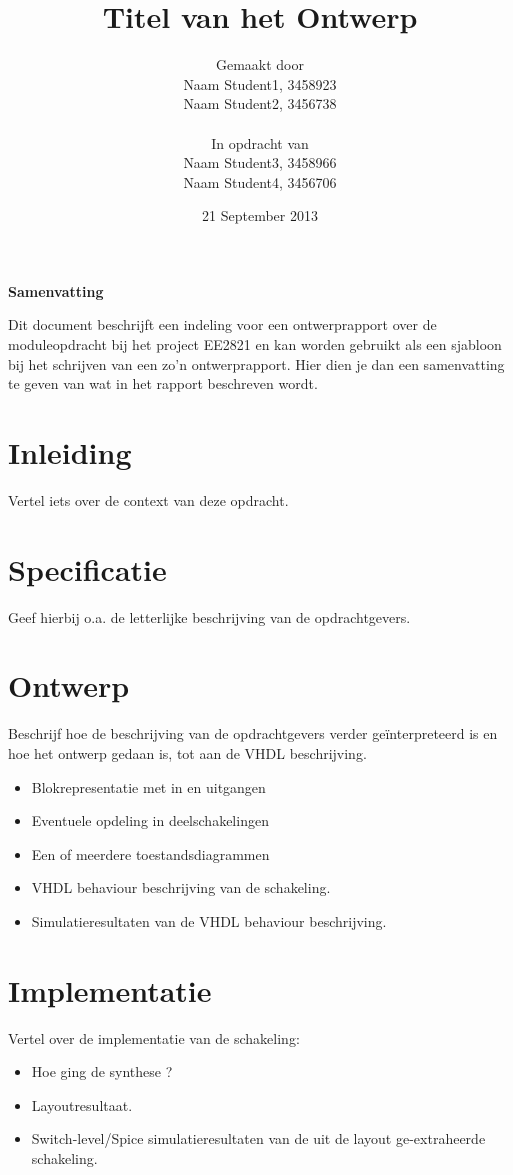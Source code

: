 \documentclass[11pt,twoside,a4paper]{article}
\title{Titel van het Ontwerp}
\author{
Gemaakt door\\
Naam Student1, 3458923\\
Naam Student2, 3456738\\
\\
In opdracht van \\
Naam Student3, 3458966\\
Naam Student4, 3456706\\
}
\date{21 September 2013}
\begin{document}
\maketitle
\thispagestyle{empty}
\vspace{30 mm}
\begin{center}
\Large \bf 
Samenvatting
\end{center}
Dit document beschrijft een indeling voor een ontwerprapport over de moduleopdracht bij het project EE2821 en kan worden gebruikt als een sjabloon bij het schrijven van een zo'n ontwerprapport.
Hier dien je dan een samenvatting te geven van wat in het rapport beschreven wordt.
\clearpage

\tableofcontents
\clearpage

\section{Inleiding}
Vertel iets over de context van deze opdracht.

\section{Specificatie}
Geef hierbij o.a. de letterlijke beschrijving van de opdrachtgevers.

\section{Ontwerp}
Beschrijf hoe de beschrijving van de opdrachtgevers verder geïnterpreteerd is en hoe het ontwerp gedaan is, tot aan de VHDL beschrijving.
\begin{itemize}
\item
Blokrepresentatie met in en uitgangen
\item
Eventuele opdeling in deelschakelingen
\item
Een of meerdere toestandsdiagrammen 
\item
VHDL behaviour beschrijving van de schakeling.
\item
Simulatieresultaten van de VHDL behaviour beschrijving.
\end{itemize}

\section{Implementatie}
Vertel over de implementatie van de schakeling:
\begin{itemize}
\item
Hoe ging de synthese ?
\item
Layoutresultaat.
\item
Switch-level/Spice simulatieresultaten van de uit de layout ge-extraheerde schakeling.
\end{itemize}
\end{document}
